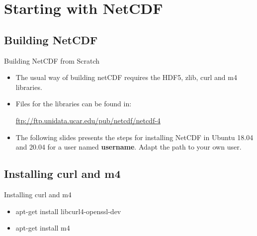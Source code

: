 \documentclass[compress,11pt,xcolor=svgnames,aspectratio=169]{beamer}
\begin{document}
\appendix

\begin{frame}[fragile]{}

{ \huge \color{EsiBlue}{ Appendix}}

\end{frame}

\section{Starting with NetCDF}
\label{ap:netcdf}

\subsection{Building NetCDF}

\begin{frame}[fragile]{Building NetCDF from Scratch}

\begin{itemize}
\setlength\itemsep{0.8cm}

  \item The usual way of building netCDF requires the HDF5, zlib, curl and m4 libraries.

  \item Files for the libraries can be found in:

  \begin{center}
  \url{ftp://ftp.unidata.ucar.edu/pub/netcdf/netcdf-4}
  \end{center}

  \item The following slides presents the steps for installing NetCDF in Ubuntu 18.04 and 20.04 for a user named \textbf{username}. Adapt the path to your own user.

\end{itemize}

\end{frame}

\subsection{Installing curl and m4}

\begin{frame}[fragile]{Installing curl and m4}

\begin{itemize}
\setlength\itemsep{0.6cm}

  \item apt-get install libcurl4-openssl-dev
  \item apt-get install m4

\end{itemize}

\end{frame}
\end{document}
